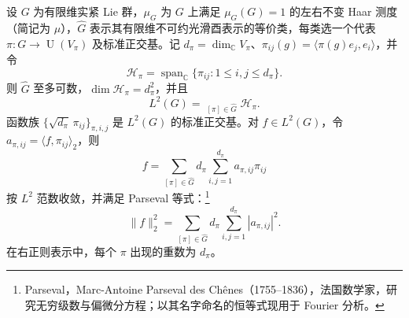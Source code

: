 \begin{theorem}\label{g1:thm:peter-weyl-hilbert}
	设 \(G\) 为有限维实紧 Lie 群，\(\mu_G\) 为 \(G\) 上满足 \(\mu_G(G)=1\) 的左右不变 Haar 测度（简记为 \(\mu\)），\(\widehat G\) 表示其有限维不可约光滑酉表示的等价类，每类选一个代表 \(\pi:G\to\operatorname{U}(V_\pi)\) 及标准正交基。记 \(d_\pi=\dim_{\mathbb C}V_\pi\)、\(\pi_{ij}(g)=\langle\pi(g)e_j,e_i\rangle\)，并令
	\[
		\mathcal H_\pi=\operatorname{span}_{\mathbb C}
		\{\pi_{ij}:1\le i,j\le d_\pi\}.
	\]
	则 \(\widehat G\) 至多可数，\(\dim \mathcal H_\pi=d_\pi^2\)，并且
	\begin{equation}\label{g1:eq:peter-weyl-hilbert-sum}
		L^2(G)=\mathop{\widehat\bigoplus}_{[\pi]\in\widehat G}\mathcal H_\pi.
	\end{equation}
	函数族 \(\{\sqrt{d_\pi}\,\pi_{ij}\}_{\pi,i,j}\) 是 \(L^2(G)\) 的标准正交基。对 \(f\in L^2(G)\)，令 \(a_{\pi,ij}=\langle f,\pi_{ij}\rangle_2\)，则
	\[
		f=\sum_{[\pi]\in\widehat G}d_\pi
		\sum_{i,j=1}^{d_\pi}a_{\pi,ij}\pi_{ij}
	\]
	按 \(L^2\) 范数收敛，并满足 Parseval 等式：\footnote{Parseval，Marc-Antoine Parseval des Chênes（1755--1836），法国数学家，研究无穷级数与偏微分方程；以其名字命名的恒等式现用于 Fourier 分析。}
	\begin{equation}\label{g1:eq:peter-weyl-parseval}
		\|f\|_2^2=\sum_{[\pi]\in\widehat G}d_\pi
		\sum_{i,j=1}^{d_\pi}|a_{\pi,ij}|^2.
	\end{equation}
	在右正则表示中，每个 \(\pi\) 出现的重数为 \(d_\pi\)。
\end{theorem}
